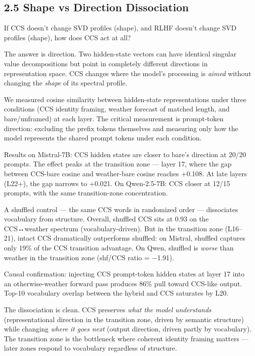 \documentclass[12pt]{article}
\begin{document}
\subsection*{2.5 Shape vs Direction Dissociation}

If CCS doesn't change SVD profiles (shape), and RLHF doesn't change SVD profiles (shape), how does CCS act at all?

The answer is direction. Two hidden-state vectors can have identical singular value decompositions but point in completely different directions in representation space. CCS changes where the model's processing is \textit{aimed} without changing the \textit{shape} of its spectral profile.

We measured cosine similarity between hidden-state representations under three conditions (CCS identity framing, weather forecast of matched length, and bare/unframed) at each layer. The critical measurement is prompt-token direction: excluding the prefix tokens themselves and measuring only how the model represents the shared prompt tokens under each condition.

Results on Mistral-7B: CCS hidden states are closer to bare's direction at 20/20 prompts. The effect peaks at the transition zone — layer 17, where the gap between CCS-bare cosine and weather-bare cosine reaches +0.108. At late layers (L22+), the gap narrows to +0.021. On Qwen-2.5-7B: CCS closer at 12/15 prompts, with the same transition-zone concentration.

A shuffled control — the same CCS words in randomized order — dissociates vocabulary from structure. Overall, shuffled CCS sits at 0.93 on the CCS↔weather spectrum (vocabulary-driven). But in the transition zone (L16–21), intact CCS dramatically outperforms shuffled: on Mistral, shuffled captures only 19\% of the CCS transition advantage. On Qwen, shuffled is \textit{worse} than weather in the transition zone (shf/CCS ratio = −1.91).

Causal confirmation: injecting CCS prompt-token hidden states at layer 17 into an otherwise-weather forward pass produces 86\% pull toward CCS-like output. Top-10 vocabulary overlap between the hybrid and CCS saturates by L20.

The dissociation is clean. CCS preserves \textit{what the model understands} (representational direction in the transition zone, driven by semantic structure) while changing \textit{where it goes next} (output direction, driven partly by vocabulary). The transition zone is the bottleneck where coherent identity framing matters — later zones respond to vocabulary regardless of structure.
\end{document}
